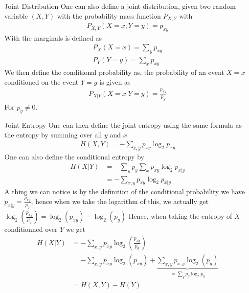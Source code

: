\begin{parag}{Joint Distribution}
    One can also define a joint distribution, given two random variable $\left(X, Y\right)$ with the probability mass function $P_{X, Y}$ with 
	\begin{align*} 
		P_{X, Y}\left(X = x, Y = y\right) = p_{xy} 
	\end{align*}
	With the marginals is defined as 
	\begin{align*} 
		P_X\left(X = x\right) = \sum_{y}p_{xy}\\
		P_Y\left(Y = y\right) = \sum_{x}p_{xy}
	\end{align*}
	We then define the conditional probability as, the probability of an event $X = x$ conditioned on the event $Y = y$ is given as 
	\begin{align*} 
		P_{X|Y} \left(X =x | Y = y\right)  = \frac{p_{xy}}{p_y}
	\end{align*}
	For $p_y \neq 0$.
\end{parag}
\begin{parag}{Joint Entropy}
    One can then define the joint entropy using the same formula as the entropy by summing over all $y$ and $x$ 
	\begin{align*} 
		H\left(X, Y\right) = - \sum_{x, y} p_{xy} \log_2 p_{xy}
	\end{align*}
	One can also define the conditional entropy by 
	\begin{align*} 
		H\left(X|Y\right) &= - \sum_{y} p_y \sum_{x}p_{xy}\log_2 p_{x|y}\\
						  &=  - \sum_{x, y}p_{xy}\log_2 p_{x|y}
	\end{align*}
	A thing we can notice is by the definition of the conditional probability we have $p_{x|y} = \frac{p_{xy}}{p_y}$, hence when we take the logarithm of this, we actually get $\log_2\left(\frac{p_{xy}}{p_y}\right) = \log_2\left(p_{xy}\right) - \log_2\left(p_y\right)$ Hence, when taking the entropy of $X$ conditionned over $Y$ we get 
	\begin{align*} 
		H\left(X | Y\right) &=  -\sum_{x, y}p_{xy}\log_2\left(\frac{p_{xy}}{p_y}\right) \\
							&= - \sum_{x, y} p_{xy}\log_2\left(p_{xy}\right) + \underbrace{\sum_{x, y}p_{x, y}\log_2\left(p_y\right)}_{= \sum_{y}p_y \log_2 p_y}\\
							&= H\left(X, Y\right) - H\left(Y\right)
	\end{align*}
\end{parag}




